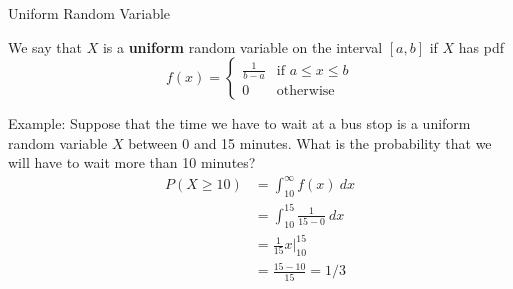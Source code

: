 \documentclass{beamer}
\renewcommand{\emph}{\textbf}
\begin{document}
\begin{frame}{Uniform Random Variable}
\begin{block}{}
We say that $X$ is a \emph{uniform} random variable on the interval $[a,b]$ if $X$ has pdf
$$f(x)=\begin{cases}\frac1{b-a} & \text{if }a\leq x\leq b \\
0 & \text{otherwise}\end{cases}$$
\end{block}
\pause Example: Suppose that the time we have to wait at a bus stop is a uniform random variable $X$ between 0 and 15 minutes. What is the probability that we will have to wait more than 10 minutes?
\pause \begin{align*}
P(X\geq 10) &= \int_{10}^\infty f(x)\ dx \\
&= \int_{10}^{15} \frac1{15-0}\ dx \\
&= \frac1{15}x\big\vert_{10}^{15} \\
&= \frac{15-10}{15} = 1/3
\end{align*}
\end{frame}
\end{document}
